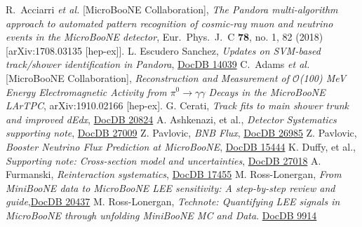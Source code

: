 \documentclass[a4paper]{article}
\begin{document}

\newpage





\begin{thebibliography}{}
  R.~Acciarri {\it et al.} [MicroBooNE Collaboration],
  \emph{The Pandora multi-algorithm approach to automated pattern recognition of cosmic-ray muon and neutrino events in the MicroBooNE detector}, Eur.\ Phys.\ J.\ C {\bf 78}, no. 1, 82 (2018) [arXiv:1708.03135 [hep-ex]].
L. Escudero Sanchez, \emph{Updates on SVM-based track/shower identification in Pandora},
\href{https://microboone-docdb.fnal.gov/cgi-bin/private/ShowDocument?docid=14039}{DocDB 14039}
  C.~Adams {\it et al.} [MicroBooNE Collaboration],
  \emph{Reconstruction and Measurement of $\mathcal{O}$(100) MeV Energy Electromagnetic Activity from $\pi^0 \rightarrow \gamma\gamma$ Decays in the MicroBooNE LArTPC},  arXiv:1910.02166 [hep-ex].
G. Cerati, \emph{Track fits to main shower trunk and improved dEdx}, \href{https://microboone-docdb.fnal.gov/cgi-bin/private/ShowDocument?docid=20824}{DocDB 20824}
A. Ashkenazi, et al., \emph{Detector Systematics supporting note}, \href{https://microboone-docdb.fnal.gov/cgi-bin/private/ShowDocument?docid=27009}{DocDB 27009}
Z. Pavlovic, \emph{BNB Flux}, \href{https://microboone-docdb.fnal.gov/cgi-bin/private/RetrieveFile?docid=26985}{DocDB 26985}
Z. Pavlovic, \emph{Booster Neutrino Flux Prediction at MicroBooNE}, \href{https://microboone-docdb.fnal.gov/cgi-bin/private/RetrieveFile?docid=15444}{DocDB 15444}
K. Duffy, et al., \emph{Supporting note: Cross-section model and uncertainties}, \href{https://microboone-docdb.fnal.gov/cgi-bin/private/ShowDocument?docid=27018}{DocDB 27018}
A. Furmanski, \emph{Reinteraction systematics}, \href{https://microboone-docdb.fnal.gov/cgi-bin/private/ShowDocument?docid=17455}{DocDB 17455}
M. Ross-Lonergan, \emph{From MiniBooNE data to MicroBooNE LEE sensitivity: A step-by-step review and guide},\href{https://microboone-docdb.fnal.gov/cgi-bin/private/RetrieveFile?docid=20437}{DocDB 20437}
 M. Ross-Lonergan, \emph{Technote: Quantifying LEE signals in MicroBooNE through unfolding MiniBooNE MC and Data}. \href{https://microboone-docdb.fnal.gov/cgi-bin/private/ShowDocument?docid=9914}{DocDB 9914}


\end{thebibliography}
\end{document}
